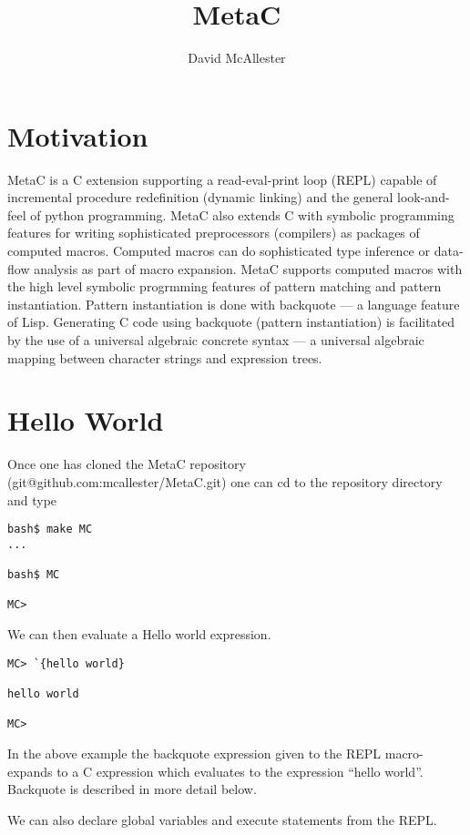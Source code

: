 \documentclass{article}
\title{MetaC}
\author{David McAllester}
\begin{document}
\maketitle

\section{Motivation}

\bigskip
\bigskip
MetaC is a C extension supporting a read-eval-print loop (REPL) capable of incremental procedure redefinition (dynamic linking) and the general look-and-feel of
python programming.  MetaC also extends C with symbolic programming features for writing sophisticated preprocessors (compilers) as packages of computed macros.
Computed macros can do
sophisticated type inference or data-flow analysis as part of macro expansion.  MetaC supports computed macros with the high level symbolic progrmming features
of pattern matching and pattern instantiation.  Pattern instantiation is done with backquote --- a language feature of Lisp.
Generating C code using backquote (pattern instantiation) is facilitated by the use of a universal algebraic concrete syntax --- a universal algebraic
mapping between character strings and expression trees.

\section{Hello World}

Once one has cloned the MetaC repository (git@github.com:mcallester/MetaC.git) one can cd to the repository directory and type 

\begin{verbatim}
bash$ make MC
...

bash$ MC

MC>
\end{verbatim}

We can then evaluate a Hello world expression.

\begin{verbatim}
MC> `{hello world}

hello world

MC>
\end{verbatim}

In the above example the backquote expression given to the REPL macro-expands to a C expression which evaluates to the expression ``hello world''.
Backquote is described in more detail below.

We can also declare global variables and execute statements from the REPL.
\end{document}

